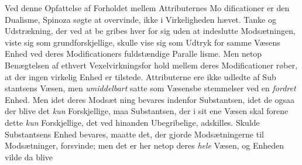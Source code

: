 \documentclass[12pt,a4paper]{book}
\begin{document}
Ved denne Opfattelse af Forholdet mellem Attributernes Mo\-%
dificationer er den Dualisme, Spinoza søgte at overvinde, ikke i
Virkeligheden hævet. Tanke og Udstrækning, der ved at be\-%
gribes hver for sig uden at indeslutte Modsætningen, viste sig
som grundforskjellige, skulle vise sig som Udtryk for samme
Væsens Enhed ved deres Modificationers fuldstændige Paralle\-%
lisme. Men netop Benægtelsen af ethvert Vexelvirkningsfor\-%
hold mellem deres Modificationer røber, at der ingen virkelig
Enhed er tilstede. Attributerne ere ikke udledte af Sub\-%
stantsens Væsen, men \emph{umiddelbart} satte som Væsensbe\-%
stemmelser ved en \emph{fordret} Enhed. Men idet deres Modsæt\-%
ning bevares indenfor Substantsen, idet de ogsaa der blive det
\emph{kun} Forskjellige, maa Substantsen, der i sit ene Væsen skal
forene dette \emph{kun} Forskjellige, det ved hinanden Ubegribelige,
adskilles. Skulde Substantsens Enhed bevares, maatte det, der
gjorde Modsætningerne til Modsætninger, forsvinde; men det
er her netop deres \emph{hele} Væsen, og Enheden vilde da blive
%
%
%
\end{document}
